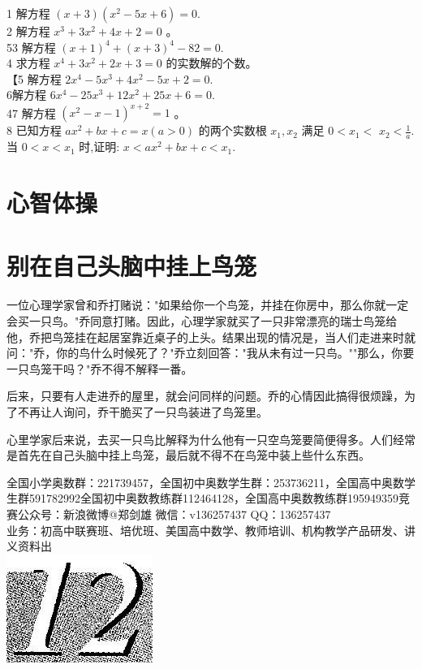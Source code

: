 \documentclass[10pt]{article}
\begin{document}
1 解方程 $(x+3)\left(x^{2}-5 x+6\right)=0$.\\
2 解方程 $x^{3}+3 x^{2}+4 x+2=0$ 。\\
53 解方程 $(x+1)^{4}+(x+3)^{4}-82=0$.\\
4 求方程 $x^{4}+3 x^{2}+2 x+3=0$ 的实数解的个数。\\
【5 解方程 $2 x^{4}-5 x^{3}+4 x^{2}-5 x+2=0$.\\
6解方程 $6 x^{4}-25 x^{3}+12 x^{2}+25 x+6=0$.\\
47 解方程 $\left(x^{2}-x-1\right)^{x+2}=1$ 。\\
8 已知方程 $a x^{2}+b x+c=x(a>0)$ 的两个实数根 $x_{1}, x_{2}$ 满足 $0<x_{1}<$ $x_{2}<\frac{1}{a}$. 当 $0<x<x_{1}$ 时,证明: $x<a x^{2}+b x+c<x_{1}$.

\section*{心智体操}
\section*{别在自己头脑中挂上鸟笼}
一位心理学家曾和乔打赌说："如果给你一个鸟笼，并挂在你房中，那么你就一定会买一只鸟。"乔同意打赌。因此，心理学家就买了一只非常漂亮的瑞士鸟笼给他，乔把鸟笼挂在起居室靠近桌子的上头。结果出现的情况是，当人们走进来时就问："乔，你的鸟什么时候死了？"乔立刻回答："我从未有过一只鸟。""那么，你要一只鸟笼干吗？"乔不得不解释一番。

后来，只要有人走进乔的屋里，就会问同样的问题。乔的心情因此搞得很烦躁，为了不再让人询问，乔干脆买了一只鸟装进了鸟笼里。

心里学家后来说，去买一只鸟比解释为什么他有一只空鸟笼要简便得多。人们经常是首先在自己头脑中挂上鸟笼，最后就不得不在鸟笼中装上些什么东西。

全国小学奥数群：221739457，全国初中奥数学生群：253736211，全国高中奥数学生群591782992全国初中奥数教练群112464128，全国高中奥数教练群195949359竞赛公众号：新浪微博@郑剑雄 微信：v136257437 QQ：136257437\\
业务：初高中联赛班、培优班、美国高中数学、教师培训、机构教学产品研发、讲义资料出\\
\includegraphics[max width=\textwidth, center]{2024_10_30_26b590fd1106d28139f0g-074}
\end{document}
